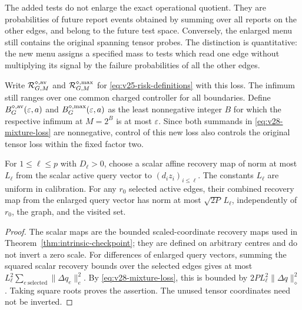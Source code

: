 The added tests do not enlarge the exact operational quotient. They
are probabilities of future report events obtained by summing over all
reports on the other edges, and belong to the future test space.
Conversely, the enlarged menu still contains the original spanning
tensor probes. The distinction is quantitative: the new menu assigns a
specified mass to tests which read one edge without multiplying its
signal by the failure probabilities of all the other edges.

Write $\mathcal R^{\diamond,\rm av}_{G,M}$ and
$\mathcal R^{\diamond,\rm max}_{G,M}$ for
\eqref{eq:v25-risk-definitions} with this loss. The infimum still
ranges over one common charged controller for all boundaries. Define
$B^{\diamond,\rm av}_G(\varepsilon,a)$ and
$B^{\diamond,\rm max}_G(\varepsilon,a)$ as the least nonnegative
integer $B$ for which the respective infimum at $M=2^B$ is at most
$\varepsilon$. Since both summands in \eqref{eq:v28-mixture-loss}
are nonnegative, control of this new loss also controls the original
tensor loss within the fixed factor two.

\begin{lemma}
\label{lem:v28-local-recovery}
For $1\le\ell\le p$ with $D_\ell>0$, choose a scalar affine
recovery map of norm at most $L_\ell$ from the scalar active query
vector to $(d_i z_i)_{i\le\ell}$. The constants $L_\ell$ are uniform
in calibration. For any $r_0$ selected active edges, their combined
recovery map from the enlarged query vector has norm at most
$\sqrt{2P}\,L_\ell$, independently of $r_0$, the graph, and the
visited set.
\end{lemma}
\begin{proof}
The scalar maps are the bounded scaled-coordinate recovery maps used
in Theorem~\ref{thm:intrinsic-checkpoint}; they are defined on arbitrary
centres and do not invert a zero scale. For differences of enlarged
query vectors, summing the squared scalar recovery bounds over the
selected edges gives at most
$L_\ell^2\sum_{e\ {\mathrm{selected}}}\|\Delta q_e\|_e^2$.
By \eqref{eq:v28-mixture-loss}, this is bounded by
$2P L_\ell^2\|\Delta q\|_\diamond^2$. Taking square roots proves
the assertion. The unused tensor coordinates need not be inverted.
\end{proof}

